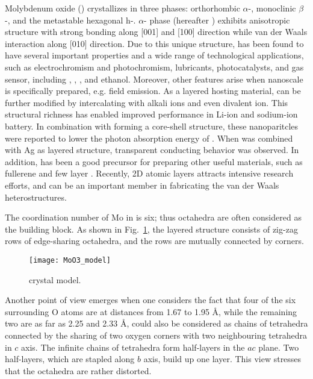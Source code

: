 Molybdenum oxide () crystallizes in three phases: orthorhombic $\alpha$-, monoclinic $\beta$-, and the metastable hexagonal h-.\citep{Deb1968,Fibers2007} $\alpha$- phase (hereafter ) exhibits anisotropic structure with strong bonding along [001] and [100] direction while van der Waals interaction along [010] direction.\cite{He2003} Due to this unique structure,  has been found to have several important properties and a wide range of technological applications, such as electrochromism and photochromism,\cite{Yao1992} lubricants,\cite{Sheehan1996} photocatalysts,\cite{Chen2010} and gas sensor, including ,\cite{Comini2005} ,\cite{Taurino2006} ,\cite{Sha2009} and ethanol.\cite{Choopun} Moreover, other features arise when nanoscale  is specifically prepared, e.g. field emission.\citep{Li2002d,Zhou2003b}  As a layered hosting material,  can be further modified by intercalating with alkali ions\citep{Spahr1995,Li2006b,Hu2011} and even divalent ion.\cite{Sian2005} This structural richness has enabled improved performance in Li-ion\cite{Mai2007} and sodium-ion battery.\cite{Hariharan2013} In combination with  forming a core-shell structure, these nanoparitcles were reported to lower the photon absorption energy of .\cite{Elder2000} When  was combined with Ag as layered structure, transparent conducting behavior was observed.\cite{Nguyen2012} In addition,  has been a good precursor for preparing other useful materials, such as  fullerene\cite{Li2003c} and few layer .\cite{Lin2012} Recently, 2D atomic layers attracts intensive research efforts, and  can be an important member in fabricating the van der Waals heterostructures.\cite{Geim2013}

The coordination number of Mo in  is six; thus  octahedra are often considered as the building block. As shown in Fig.~\ref{fig:mo3model}, the layered structure consists of zig-zag rows of edge-sharing  octahedra, and the rows are mutually connected by corners.
\begin{figure}[htb]
\centering
\texttt{[image: MoO3\_model]}
\caption[ crystal model]{ crystal model.}
\label{fig:mo3model}
\end{figure}
Another point of view emerges when one considers the fact that four of the six surrounding O atoms are at distances from 1.67 to 1.95 \AA, while the remaining two are as far as 2.25 and 2.33 \AA,  could also be considered as chains of  tetrahedra connected by the sharing of two oxygen corners with two neighbouring tetrahedra in $c$ axis. The infinite chains of  tetrahedra form half-layers in the $ac$ plane. Two half-layers, which are stapled along $b$ axis, build up one  layer.\cite{Itoh2001a} This view stresses that the  octahedra are rather distorted.


